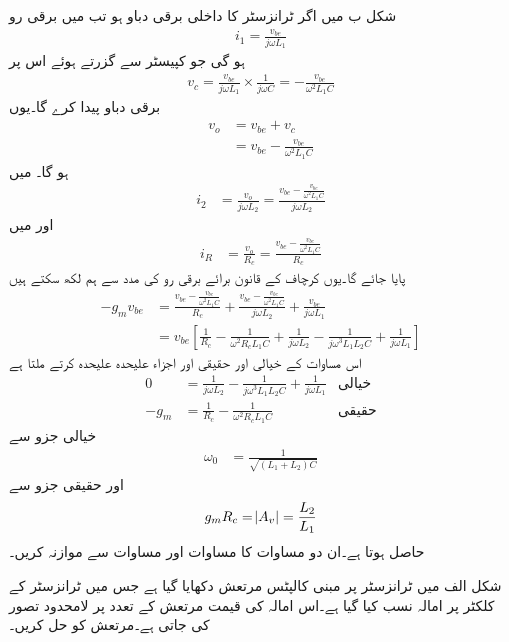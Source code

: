 شکل  ب میں اگر ٹرانزسٹر کا داخلی برقی دباو  ہو تب  میں برقی رو
\begin{align*}
i_1=\frac{v_{be}}{j \omega L_1}
\end{align*}
ہو گی جو کپیسٹر  سے گزرتے ہوئے اس پر
\begin{align*}
v_c =\frac{v_{be}}{j \omega L_1} \times \frac{1}{j \omega C}=-\frac{v_{be}}{\omega^2 L_1 C}
\end{align*}
برقی دباو پیدا کرے گا۔یوں
\begin{align*}
v_o&=v_{be}+v_c\\
&=v_{be}-\frac{v_{be}}{\omega^2 L_1 C}
\end{align*}
ہو گا۔ میں
\begin{align*}
i_2&=\frac{v_o}{j \omega L_2}=\frac{v_{be}-\frac{v_{be}}{\omega^2 L_1 C}}{j \omega L_2}
\end{align*}
اور  میں
\begin{align*}
i_R&=\frac{v_o}{R_c}=\frac{v_{be}-\frac{v_{be}}{\omega^2 L_1 C}}{R_c}
\end{align*}
پایا جائے گا۔یوں کرچاف کے قانون برائے برقی رو کی مدد سے ہم لکھ سکتے ہیں
\begin{align*}
-g_m v_{be}&=\frac{v_{be}-\frac{v_{be}}{\omega^2 L_1 C}}{R_c}+\frac{v_{be}-\frac{v_{be}}{\omega^2 L_1 C}}{j \omega L_2}+\frac{v_{be}}{j \omega L_1}\\
&=v_{be} \left[\frac{1}{R_c}-\frac{1}{\omega^2 R_c L_1 C} +\frac{1}{j \omega L_2}-\frac{1}{j \omega^3 L_1 L_2 C} +\frac{1}{j \omega L_1}\right]
\end{align*}
اس مساوات کے خیالی اور حقیقی اور اجزاء علیحدہ علیحدہ کرتے ملتا ہے
\begin{align*}
0&=\frac{1}{j \omega L_2}-\frac{1}{j \omega^3 L_1 L_2 C}+\frac{1}{j \omega L_1} & \textrm{خیالی}\\
-g_m&=\frac{1}{R_c}-\frac{1}{\omega^2 R_c L_1 C} & \textrm{حقیقی}
\end{align*}
خیالی جزو سے
\begin{align}
\omega_0&=\frac{1}{\sqrt{\left(L_1+L_2 \right) C}}
\end{align}
اور حقیقی جزو سے
\begin{align}
g_m R_c=\abs{A_v}=\frac{L_2}{L_1}
\end{align}
حاصل ہوتا ہے۔ان دو مساوات کا مساوات   اور مساوات  سے موازنہ کریں۔

شکل  الف میں ٹرانزسٹر پر مبنی کالپٹس مرتعش دکھایا گیا ہے جس میں ٹرانزسٹر کے کلکٹر پر امالہ  نسب کیا گیا ہے۔اس امالہ کی قیمت مرتعش کے تعدد پر لامحدود تصور کی جاتی ہے۔مرتعش کو حل کریں۔

